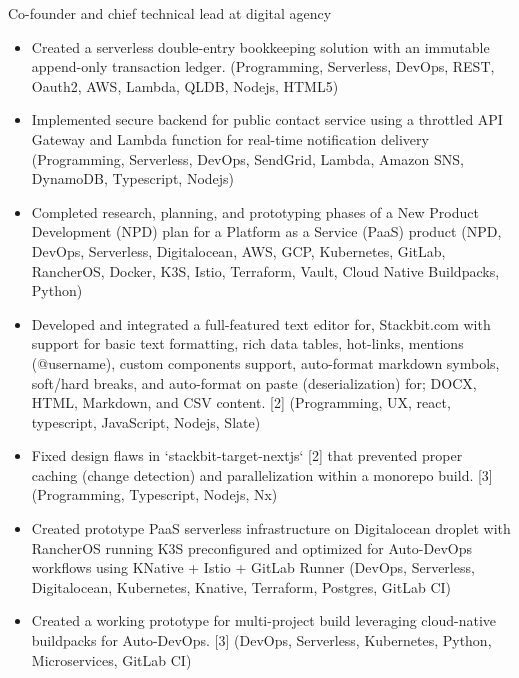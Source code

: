 


Co-founder and chief technical lead at digital agency

\begin{itemize}
  \item Created a serverless double-entry bookkeeping solution with an immutable append-only transaction ledger. {\tiny (Programming,  Serverless, DevOps, REST, Oauth2, AWS, Lambda,  QLDB, Nodejs, HTML5)}
  \item Implemented secure backend for public contact service using a throttled API Gateway and Lambda function for real-time notification delivery {\tiny (Programming, Serverless, DevOps, SendGrid, Lambda, Amazon SNS, DynamoDB, Typescript, Nodejs)}
  \item Completed research, planning, and prototyping phases of a New Product Development (NPD) plan for a Platform as a Service (PaaS) product {\tiny (NPD, DevOps, Serverless, Digitalocean, AWS, GCP, Kubernetes, GitLab, RancherOS, Docker, K3S, Istio, Terraform, Vault, Cloud Native Buildpacks, Python)}
\end{itemize}

\begin{itemize}
  \item Developed and integrated a full-featured text editor for, Stackbit.com with support for basic text formatting, rich data tables,   hot-links, mentions (@username), custom components support, auto-format markdown symbols, soft/hard breaks, and auto-format on paste (deserialization) for; DOCX, HTML, Markdown, and CSV content. [2] {\tiny (Programming, UX, react, typescript, JavaScript, Nodejs, Slate)}
  \item Fixed design flaws in `stackbit-target-nextjs` [2] that prevented proper caching (change detection) and parallelization within a monorepo build. [3] {\tiny (Programming, Typescript, Nodejs, Nx)}
\end{itemize}

\begin{itemize}
  \item Created prototype PaaS serverless infrastructure on Digitalocean droplet with RancherOS running K3S preconfigured and optimized for Auto-DevOps workflows using KNative + Istio + GitLab Runner {\tiny (DevOps, Serverless, Digitalocean, Kubernetes, Knative, Terraform, Postgres, GitLab CI)}
  \item Created a working prototype for multi-project build leveraging cloud-native buildpacks for Auto-DevOps. [3] {\tiny (DevOps, Serverless, Kubernetes, Python, Microservices, GitLab CI)}
\end{itemize}

